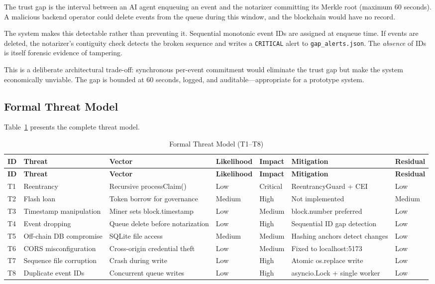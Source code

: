 \documentclass[12pt,a4paper]{article}
\begin{document}
The trust gap is the interval between an AI agent enqueuing an event
and the notarizer committing its Merkle root (maximum 60 seconds).
A malicious backend operator could delete events from the queue during
this window, and the blockchain would have no record.

The system makes this detectable rather than preventing it. Sequential
monotonic event IDs are assigned at enqueue time. If events are deleted,
the notarizer's contiguity check detects the broken sequence and writes a
\texttt{CRITICAL} alert to \texttt{gap\_alerts.json}. The \emph{absence}
of IDs is itself forensic evidence of tampering.

This is a deliberate architectural trade-off: synchronous per-event
commitment would eliminate the trust gap but make the system
economically unviable. The gap is bounded at 60 seconds, logged, and
auditable---appropriate for a prototype system.

\subsection{Formal Threat Model}
\label{sec:threat-model}

Table~\ref{tab:threats} presents the complete threat model.

\begin{longtable}{@{}p{0.3cm}p{2.5cm}p{3cm}p{1.5cm}p{1.5cm}p{3cm}p{1.5cm}@{}}
\caption{Formal Threat Model (T1--T8)}
\label{tab:threats}\\
\toprule
\rowcolor{gray!15}
\textbf{ID} & \textbf{Threat} & \textbf{Vector} & \textbf{Likelihood} & \textbf{Impact} & \textbf{Mitigation} & \textbf{Residual} \\
\midrule
\endfirsthead
\toprule
\rowcolor{gray!15}
\textbf{ID} & \textbf{Threat} & \textbf{Vector} & \textbf{Likelihood} & \textbf{Impact} & \textbf{Mitigation} & \textbf{Residual} \\
\midrule
\endhead
T1 & Reentrancy & Recursive processClaim() & Low & Critical & ReentrancyGuard + CEI & Low \\
T2 & Flash loan & Token borrow for governance & Medium & High & Not implemented & Medium \\
T3 & Timestamp manipulation & Miner sets block.timestamp & Low & Medium & block.number preferred & Low \\
T4 & Event dropping & Queue delete before notarization & Low & High & Sequential ID gap detection & Low \\
T5 & Off-chain DB compromise & SQLite file access & Medium & Medium & Hashing anchors detect changes & Low \\
T6 & CORS misconfiguration & Cross-origin credential theft & Low & Medium & Fixed to localhost:5173 & Low \\
T7 & Sequence file corruption & Crash during write & Low & High & Atomic os.replace write & Low \\
T8 & Duplicate event IDs & Concurrent queue writes & Low & High & asyncio.Lock + single worker & Low \\
\bottomrule
\end{longtable}
\end{document}
